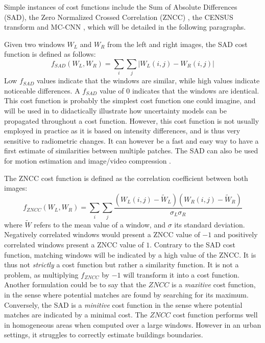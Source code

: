 \begin{example}\label{ex:cost_functions}
	Simple instances of cost functions include the Sum of Absolute Differences (SAD), the Zero Normalized Crossed Correlation (ZNCC)  \cite{hannah_computer_1994}, the CENSUS transform \cite{zabih_non-parametric_1994} and MC-CNN \cite{zbontar_stereo_2016}, which will be detailed in the following paragraphs.
	
	Given two windows $W_L$ and $W_R$ from the left and right images, the SAD cost function is defined as follows:
	\begin{equation}
		f_{SAD}(W_L, W_R)  = \sum_i\sum_j | W_L(i,j) - W_R(i,j) |
	\end{equation}
	Low $f_{SAD}$ values indicate that the windows are similar, while high values indicate noticeable differences. A $f_{SAD}$ value of $0$ indicates that the windows are identical. This cost function is probably the simplest cost function one could imagine, and will be used in  to didactically illustrate how uncertainty models can be propagated throughout a cost function. However, this cost function is not usually employed in practice as it is based on intensity differences, and is thus very sensitive to radiometric changes. It can however be a fast and easy way to have a first estimate of similarities between multiple patches. The SAD can also be used for motion estimation and image/video compression \cite{richardson_h264_2006}.
	
	The ZNCC cost function is defined as the correlation coefficient between both images:
	\begin{equation}
		f_{ZNCC}(W_L, W_R)  = \sum_i\sum_j \frac{(W_L(i,j)  - \tilde{W}_L) (W_R(i,j)  - \tilde{W}_R) }{\sigma_L\sigma_R}
	\end{equation}
	where $\tilde{W}$ refers to the mean value of a window, and $\sigma$ its standard deviation. Negatively correlated windows would present a ZNCC value of $-1$ and positively correlated windows present a ZNCC value of $1$. Contrary to the SAD cost function, matching windows will be indicated by a high value of the ZNCC. It is thus not \textit{strictly} a cost function but rather a similarity function. It is not a problem, as multiplying $f_{ZNCC}$ by $-1$ will transform it into a cost function. Another formulation could be to say that the $ZNCC$ is a \textit{maxitive} cost function, in the sense where potential matches are found by searching for its maximum. Conversely, the SAD is a \textit{minitive} cost function in the sense where potential matches are indicated by a minimal cost. The $ZNCC$ cost function performs well in homogeneous areas when computed over a large windows. However in an urban settings, it struggles to correctly estimate buildings boundaries.
	

\end{example}
